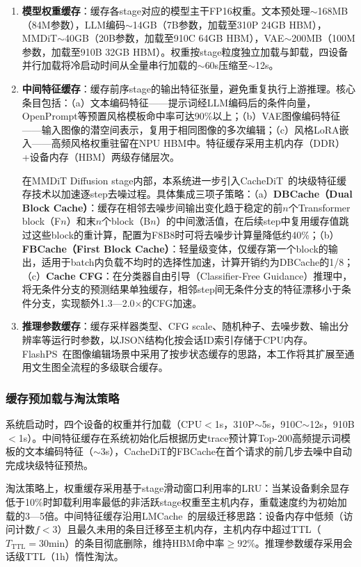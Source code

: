 \documentclass{ctexart}
\begin{document}
\begin{enumerate}
    \item \textbf{模型权重缓存}：缓存各stage对应的模型主干FP16权重。文本预处理$\sim$168MB（84M参数），LLM编码$\sim$14GB（7B参数，加载至310P 24GB HBM），MMDiT$\sim$40GB（20B参数，加载至910C 64GB HBM），VAE$\sim$200MB（100M参数，加载至910B 32GB HBM）。权重按stage粒度独立加载与卸载，四设备并行加载将冷启动时间从全量串行加载的$\sim$60s压缩至$\sim$12s。
    \item \textbf{中间特征缓存}：缓存前序stage的输出特征张量，避免重复执行上游推理。核心条目包括：（a）文本编码特征——提示词经LLM编码后的条件向量，OpenPrompt等预置风格模板命中率可达90\%以上；（b）VAE图像编码特征——输入图像的潜空间表示，复用于相同图像的多次编辑；（c）风格LoRA嵌入——高频风格权重驻留在NPU HBM中。特征缓存采用主机内存（DDR）+设备内存（HBM）两级存储层次。

    在MMDiT Diffusion stage内部，本系统进一步引入CacheDiT~\cite{CacheDiTTrainingfreeCache2025}的块级特征缓存技术以加速逐step去噪过程。具体集成三项子策略：（a）\textbf{DBCache（Dual Block Cache）}：缓存在相邻去噪步间输出变化趋于稳定的前$n$个Transformer block（F$n$）和末$n$个block（B$n$）的中间激活值，在后续step中复用缓存值跳过这些block的重计算，配置为F8B8时可将去噪步计算量降低约40\%；（b）\textbf{FBCache（First Block Cache）}：轻量级变体，仅缓存第一个block的输出，适用于batch内负载不均时的选择性加速，计算开销约为DBCache的1/8；（c）\textbf{Cache CFG}：在分类器自由引导（Classifier-Free Guidance）推理中，将无条件分支的预测结果单独缓存，相邻step间无条件分支的特征漂移小于条件分支，实现额外1.3—2.0$\times$的CFG加速。
    \item \textbf{推理参数缓存}：缓存采样器类型、CFG scale、随机种子、去噪步数、输出分辨率等运行时参数，以JSON结构化按会话ID索引存储于CPU内存。FlashPS~\cite{FlashPSEfficientGenerativeJiang2026}在图像编辑场景中采用了按步状态缓存的思路，本工作将其扩展至通用文生图全流程的多级联合缓存。
\end{enumerate}

\subsubsection{缓存预加载与淘汰策略}

系统启动时，四个设备的权重并行加载（CPU$<$1s，310P$\sim$5s，910C$\sim$12s，910B$<$1s）。中间特征缓存在系统初始化后根据历史trace预计算Top-200高频提示词模板的文本编码特征（$\sim$3s），CacheDiT的FBCache在首个请求的前几步去噪中自动完成块级特征预热。

淘汰策略上，权重缓存采用基于stage滑动窗口利用率的LRU：当某设备剩余显存低于10\%时卸载利用率最低的非活跃stage权重至主机内存，重载速度约为初始加载的3—5倍。中间特征缓存沿用LMCache~\cite{LMCacheEfficientKVLiu2025}的层级迁移思路：设备内存中低频（访问计数$f<3$）且最久未用的条目迁移至主机内存，主机内存中超过TTL（$T_{\text{TTL}}=30$min）的条目彻底删除，维持HBM命中率$\ge92\%$。推理参数缓存采用会话级TTL（1h）惰性淘汰。
\end{document}
